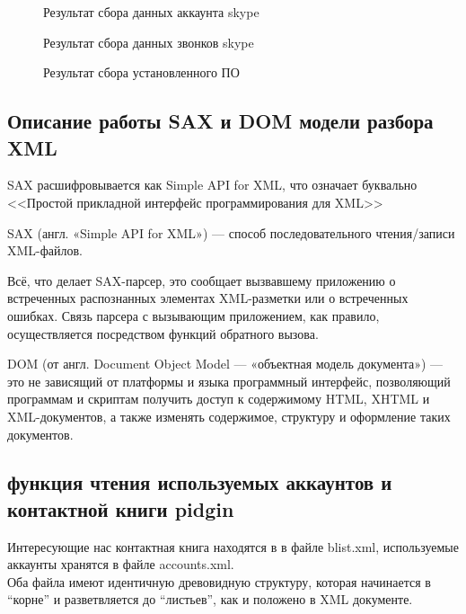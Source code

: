 \begin{figure}[h]
\caption{Результат сбора данных аккаунта skype}
\label{pic:xml_to_xslt5}
\end{figure}

\begin{figure}[h]
\caption{Результат сбора данных звонков skype}
\label{pic:xml_to_xslt6}
\end{figure}

\begin{figure}[h]
\caption{Результат сбора установленного ПО}
\label{pic:xml_to_xslt7}
\end{figure}

\subsection{Описание работы SAX и DOM модели разбора XML}

SAX расшифровывается как Simple API for XML, что означает буквально <<Простой прикладной интерфейс программирования для XML>>

SAX (англ. «Simple API for XML») — способ последовательного чтения/записи XML-файлов.

Всё, что делает SAX-парсер, это сообщает вызвавшему приложению о встреченных распознанных элементах XML-разметки или о встреченных ошибках. Связь парсера с вызывающим приложением, как правило, осуществляется посредством функций обратного вызова.

DOM (от англ. Document Object Model — «объектная модель документа») — это не зависящий от платформы и языка программный интерфейс, позволяющий программам и скриптам получить доступ к содержимому HTML, XHTML и XML-документов, а также изменять содержимое, структуру и оформление таких документов.\cite{valikov}

\subsection{функция чтения используемых аккаунтов и контактной книги pidgin}

Интересующие нас контактная книга находятся в %
в файле blist.xml, используемые аккаунты хранятся в файле accounts.xml.
\\Оба файла имеют идентичную древовидную структуру, которая начинается в ``корне'' и разветвляется до ``листьев'', как и положено в XML документе.

